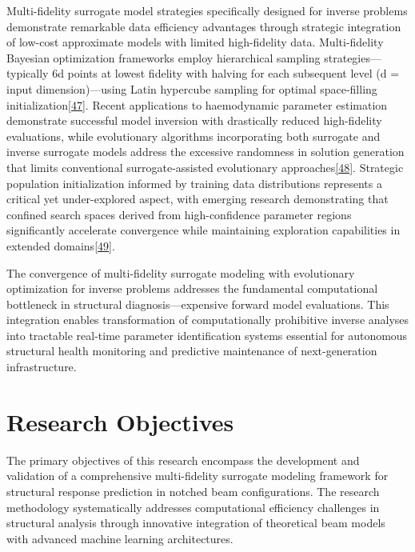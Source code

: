 \documentclass[12pt,a4paper]{report}
\begin{document}
Multi-fidelity surrogate model strategies specifically designed for inverse problems demonstrate remarkable data efficiency advantages through strategic integration of low-cost approximate models with limited high-fidelity data. Multi-fidelity Bayesian optimization frameworks employ hierarchical sampling strategies—typically 6d points at lowest fidelity with halving for each subsequent level (d = input dimension)—using Latin hypercube sampling for optimal space-filling initialization\href{https://royalsocietypublishing.org/doi/10.1098/rsif.2015.1107}{[47]}. Recent applications to haemodynamic parameter estimation demonstrate successful model inversion with drastically reduced high-fidelity evaluations, while evolutionary algorithms incorporating both surrogate and inverse surrogate models address the excessive randomness in solution generation that limits conventional surrogate-assisted evolutionary approaches\href{https://www.ieee-jas.net/en/article/doi/10.1109/JAS.2025.125111}{[48]}. Strategic population initialization informed by training data distributions represents a critical yet under-explored aspect, with emerging research demonstrating that confined search spaces derived from high-confidence parameter regions significantly accelerate convergence while maintaining exploration capabilities in extended domains\href{https://link.springer.com/article/10.1007/s00170-021-07642-x}{[49]}.

The convergence of multi-fidelity surrogate modeling with evolutionary optimization for inverse problems addresses the fundamental computational bottleneck in structural diagnosis—expensive forward model evaluations. This integration enables transformation of computationally prohibitive inverse analyses into tractable real-time parameter identification systems essential for autonomous structural health monitoring and predictive maintenance of next-generation infrastructure.

\section{Research Objectives}

The primary objectives of this research encompass the development and validation of a comprehensive multi-fidelity surrogate modeling framework for structural response prediction in notched beam configurations. The research methodology systematically addresses computational efficiency challenges in structural analysis through innovative integration of theoretical beam models with advanced machine learning architectures.
\end{document}
